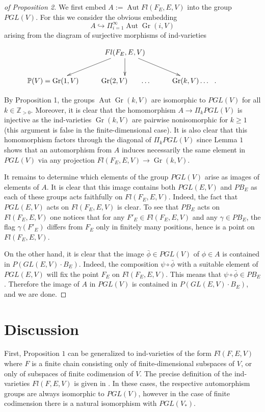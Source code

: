 \documentclass[11pt,twoside]{gsp}
\begin{document}
\begin{proof}[ of Proposition 2] We first embed $A:=\operatorname{Aut}Fl(F_E,E,V)$ into the group $PGL(V)$. For this we consider the obvious embedding $$A\hookrightarrow\Pi_{i=1}^{\infty}\operatorname{Aut} \operatorname{Gr}(i,V)$$
arising from the diagram of surjective morphisms of ind-varieties





$$
\xymatrix{
&{}Fl(F_E,E,V)\ar[dl]\ar[d]\ar[dr]\\
\mathbb{P}(V)=\operatorname{Gr}(1,V)&{}\operatorname{Gr}(2,V)\:\:\:\:\:\:\:\:\dots&{}\operatorname{Gr}(k,V)\dots\:\:\:.&{}
}
$$

By Proposition 1, the groups $\operatorname{Aut}\operatorname{Gr}(k,V)$ are isomorphic to $PGL(V)$ for all $k\in\mathbb Z_{>0}$. Moreover, it is clear that the homomorphism $A\to\Pi_k PGL(V)$ is injective as the ind-varieties $\operatorname{Gr}(k,V)$ are pairwise nonisomorphic for $k\geq 1$ \cite{PT} (this argument is false in the finite-dimensional case). It is also clear that this homomorphism
 factors through the diagonal of $\Pi_k PGL(V)$ since Lemma $1$ shows that an automorphism from $A$ induces necessarily the same element in $PGL(V)$ via any projection $Fl(F_E,E,V)\to\operatorname{Gr}(k,V)$.

It remains to determine which elements of the group $PGL(V)$ arise as images of elements of $A$. It is clear that this image contains both $PGL(E,V)$ and $PB_E$ as each of these groups acts faithfully on $Fl(F_E,E,V)$. Indeed, the fact that $PGL(E,V)$ acts on $Fl(F_E,E,V)$ is clear. To see that $PB_E$ acts on $Fl(F_E,E,V)$ one notices that  for any $F'_E\in Fl(F_E,E,V)$ and any $\gamma\in PB_E$, the flag $\gamma(F'_E)$ differs from $F_E$ only in finitely many positions, hence is a point on $Fl(F_E,E,V).$ 

On the other hand, it is clear that the image $\bar\phi\in PGL(V)$ of $\phi\in A$ is contained in $P(GL(E,V)\cdot B_E)$. Indeed, the composition $\psi\circ\bar\phi$ with a suitable element of $PGL(E,V)$ will fix the point $F_E$ on $Fl(F_E,E,V)$. This means that $\psi\circ\bar\phi\in PB_E$. Therefore the image of $A$ in $PGL(V)$ is contained in $P(GL(E,V)\cdot B_E)$,                  and we are done.



\end{proof}
    

\section{Discussion}
 First, Proposition $1$ can be generalized to ind-varieties of the form $Fl(F,E,V)$ where $F$ is a finite chain consisting only of finite-dimensional subspaces of $V$, or only of subspaces of finite codimension of $V$. The precise definition of the ind-varieties $Fl(F,E,V)$ is given in \cite{DP}. In these cases, the respective automorphism groups are always isomorphic to $PGL(V)$, however in the case of finite codimension there is a natural isomorphism with $PGL(V_*)$.
\end{document}
